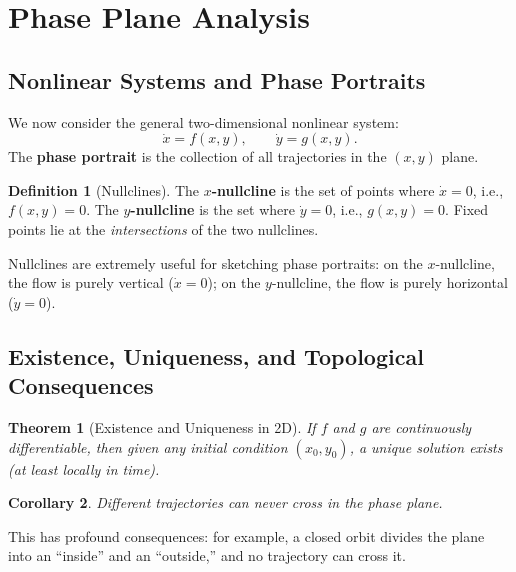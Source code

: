 \documentclass[11pt,letterpaper]{article}
\theoremstyle{definition}
\newtheorem{definition}{Definition}[section]
\theoremstyle{plain}
\newtheorem{theorem}{Theorem}[section]
\newtheorem{corollary}[theorem]{Corollary}
\theoremstyle{remark}
\begin{document}
\section{Phase Plane Analysis}\label{sec:phase-plane}

\subsection{Nonlinear Systems and Phase Portraits}

We now consider the general two-dimensional nonlinear system:
\begin{equation}\label{eq:2d-nonlinear}
  \dot{x} = f(x,y), \qquad \dot{y} = g(x,y).
\end{equation}
The \textbf{phase portrait} is the collection of all trajectories in the
$(x,y)$ plane.

\begin{definition}[Nullclines]
The \textbf{$x$-nullcline} is the set of points where $\dot{x}=0$, i.e.,
$f(x,y)=0$.  The \textbf{$y$-nullcline} is the set where $\dot{y}=0$, i.e.,
$g(x,y)=0$.  Fixed points lie at the \emph{intersections} of the two
nullclines.
\end{definition}

Nullclines are extremely useful for sketching phase portraits:
on the $x$-nullcline, the flow is purely vertical ($\dot{x}=0$); on the
$y$-nullcline, the flow is purely horizontal ($\dot{y}=0$).

\subsection{Existence, Uniqueness, and Topological Consequences}

\begin{theorem}[Existence and Uniqueness in 2D]
If $f$ and $g$ are continuously differentiable, then given any initial
condition $(x_0,y_0)$, a unique solution exists (at least locally in time).
\end{theorem}

\begin{corollary}
Different trajectories can never cross in the phase plane.
\end{corollary}

This has profound consequences: for example, a closed orbit divides the plane
into an ``inside'' and an ``outside,'' and no trajectory can cross it.
\end{document}
